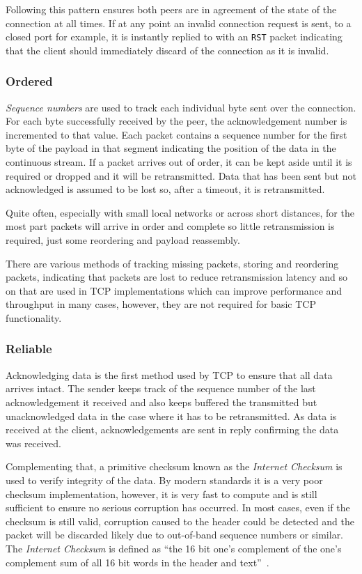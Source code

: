         Following this pattern ensures both peers are in agreement of the state of the connection at all times. If at any point an invalid connection request is sent, to a closed port for example, it is instantly replied to with an \texttt{RST} packet indicating that the client should immediately discard of the connection as it is invalid.

    \subsubsection{Ordered}
        \textit{Sequence numbers} are used to track each individual byte sent over the connection. For each byte successfully received by the peer, the acknowledgement number is incremented to that value. Each packet contains a sequence number for the first byte of the payload in that segment indicating the position of the data in the continuous stream. If a packet arrives out of order, it can be kept aside until it is required or dropped and it will be retransmitted. Data that has been sent but not acknowledged is assumed to be lost so, after a timeout, it is retransmitted.

        Quite often, especially with small local networks or across short distances, for the most part packets will arrive in order and complete so little retransmission is required, just some reordering and payload reassembly.

        There are various methods of tracking missing packets, storing and reordering packets, indicating that packets are lost to reduce retransmission latency and so on that are used in TCP implementations which can improve performance and throughput in many cases, however, they are not required for basic TCP functionality.

    \subsubsection{Reliable}\label{sec:reliable}
        Acknowledging data is the first method used by TCP to ensure that all data arrives intact. The sender keeps track of the sequence number of the last acknowledgement it received and also keeps buffered the transmitted but unacknowledged data in the case where it has to be retransmitted. As data is received at the client, acknowledgements are sent in reply confirming the data was received.

        Complementing that, a primitive checksum known as the \textit{Internet Checksum} is used to verify integrity of the data. By modern standards it is a very poor checksum implementation, however, it is very fast to compute and is still sufficient to ensure no serious corruption has occurred. In most cases, even if the checksum is still valid, corruption caused to the header could be detected and the packet will be discarded likely due to out-of-band sequence numbers or similar. The \textit{Internet Checksum} is defined as ``the 16 bit one's complement of the one's complement sum of all 16 bit words in the header and text''~\cite[3.1]{rfc793}.

